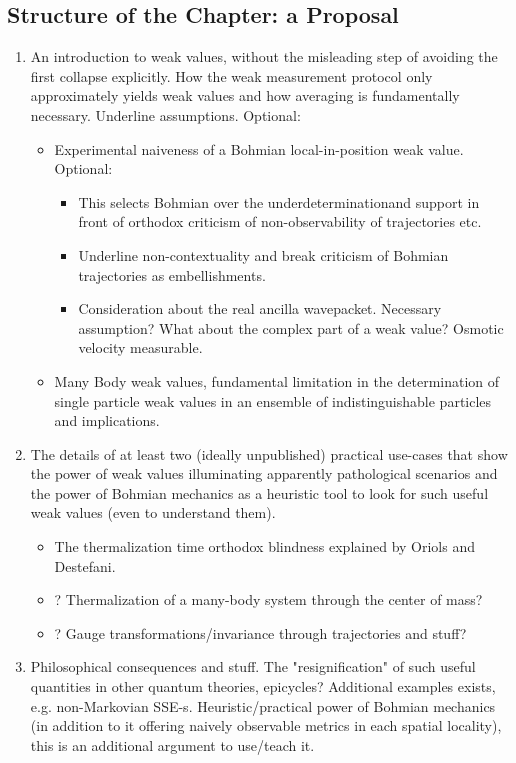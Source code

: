 \documentclass[11pt, a4paper]{article} %
\begin{document}
\subsection*{Structure of the Chapter: a Proposal}
\begin{enumerate}
\item An introduction to weak values, without the misleading step of avoiding the first collapse explicitly. How the weak measurement protocol only approximately yields weak values and how averaging is fundamentally necessary. Underline assumptions. Optional: 

\begin{itemize}
\item Experimental naiveness of a Bohmian local-in-position weak value. Optional:

\begin{itemize}
\item This selects Bohmian over the underdeterminationand support in front of orthodox criticism of non-observability of trajectories etc.

\item Underline non-contextuality and break criticism of Bohmian trajectories as embellishments.

\item Consideration about the real ancilla wavepacket. Necessary assumption? What about the complex part of a weak value? Osmotic velocity measurable.
\end{itemize} 

\item Many Body weak values, fundamental limitation in the determination of single particle weak values in an ensemble of indistinguishable particles and implications.

\end{itemize} 

\item The details of at least two (ideally unpublished) practical use-cases that show the power of weak values illuminating apparently pathological scenarios and the power of Bohmian mechanics as a heuristic tool to look for such useful weak values (even to understand them).
\begin{itemize}
\item The thermalization time orthodox blindness explained by Oriols and Destefani.
\item ? Thermalization of a many-body system through the center of mass?
\item ? Gauge transformations/invariance through trajectories and stuff?
\end{itemize}

\item Philosophical consequences and stuff. The "resignification" of such useful quantities in other quantum theories, epicycles? Additional examples exists, e.g. non-Markovian SSE-s. Heuristic/practical power of Bohmian mechanics (in addition to it offering naively observable metrics in each spatial locality), this is an additional argument to use/teach it.

\end{enumerate}
\end{document}
